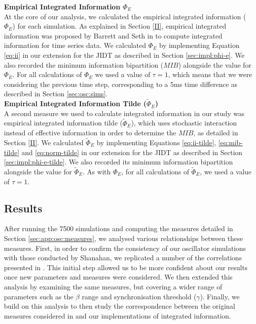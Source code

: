 \documentclass[a4paper,11pt]{article}
\begin{document}
\noindent \textbf{Empirical Integrated Information $\Phi_{E}$}\\
\noindent At the core of our analysis, we calculated the empirical integrated information ($\Phi_E$) for each simulation. As explained in Section \ref{II}, empirical integrated information was proposed by Barrett and Seth in \cite{Barrett2011} to compute integrated information for time series data. We calculated $\Phi_{E}$ by implementing Equation \ref{eq:ii} in our extension for the JIDT as described in Section \ref{sec:impl:phi-e}. We also recorded the minimum information bipartition ($MIB$) alongside the value for $\Phi_{E}$. For all calculations of $\Phi_E$ we used a value of $\tau = 1$, which means that we were considering the previous time step, corresponding to a 5ms time difference as described in Section \ref{sec:osc:sims}.\\

\noindent \textbf{Empirical Integrated Information Tilde ($\widetilde{\Phi}_{E}$)}\\
\noindent A second measure we used to calculate integrated information in our study was empirical integrated information tilde ($\widetilde{\Phi}_{E}$), which uses stochastic interaction instead of effective information in order to determine the $MIB$, as detailed in Section \ref{II}. We calculated $\widetilde{\Phi}_{E}$ by implementing Equations \ref{eq:ii-tilde},  \ref{eq:mib-tilde} and \ref{eq:norm-tilde} in our extension for the JIDT as described in Section \ref{sec:impl:phi-e-tilde}. We also recorded its minimum information bipartition alongside the value for $\widetilde{\Phi}_{E}$. As with $\Phi_E$, for all calculations of $\widetilde{\Phi}_{E}$, we used a value of $\tau = 1$.\\

\subsection{Results}
\label{sec:app:osc:res}

After running the 7500 simulations and computing the measures detailed in Section \ref{sec:app:osc:measures}, we analysed various relationships between these measures. First, in order to confirm the consistency of our oscillator simulations with those conducted by Shanahan, we replicated a number of the correlations presented in \cite{Shanahan2010}. This initial step allowed us to be more confident about our results once new parameters and measures were considered. We then extended this analysis by examining the same measures, but covering a wider range of parameters such as the $\beta$ range and synchronisation threshold ($\gamma$). Finally, we build on this analysis to then study the correspondence between the original measures considered in \cite{Shanahan2010} and our implementations of integrated information.
\end{document}
